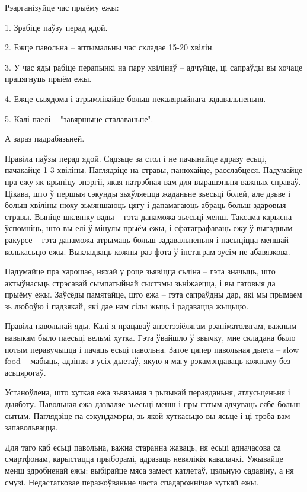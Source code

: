 Рэарганізуйце час прыёму ежы:

1. Зрабіце паўзу перад ядой.

2. Ежце павольна – аптымальны час складае 15-20 хвілін.

3. У час яды рабіце перапынкі на пару хвілінаў – адчуйце, ці сапраўды вы хочаце працягнуць прыём ежы.

4. Ежце сьвядома і атрымлівайце больш некалярыйнага задавальненьня.

5. Калі паелі – "завяршыце сталаваньне".

А зараз падрабязьней.

Правіла паўзы перад ядой. Сядзьце за стол і не пачынайце адразу есьці, пачакайце 1-3 хвіліны. Паглядзіце на стравы, панюхайце, расслабцеся. Падумайце пра ежу як крыніцу энэргіі, якая патрэбная вам для вырашэньня важных справаў. Цікава, што ў першыя сэкунды зьяўляецца жаданьне зьесьці болей, але дзьве і больш хвіліны нюху зьмяншаюць цягу і дапамагаюць абраць больш здаровыя стравы. Выпіце шклянку вады – гэта дапаможа зьесьці менш. Таксама карысна ўспомніць, што вы елі ў мінулы прыём ежы, і сфатаграфаваць ежу ў выгадным ракурсе – гэта дапаможа атрымаць больш задавальненьня і насыціцца меншай колькасьцю ежы. Выкладваць кожны раз фота ў інстаграм зусім не абавязкова.

Падумайце пра харошае, няхай у роце зьявіцца сьліна – гэта значыць, што актыўнасьць стрэсавай сымпатыйнай сыстэмы зьніжаецца, і вы гатовыя да прыёму ежы. Заўсёды памятайце, што ежа – гэта сапраўдны дар, які мы прымаем зь любоўю і падзякай, які дае нам сілы жыць і радавацца жыцьцю.

Правіла павольнай яды. Калі я працаваў анэстэзіёлягам-рэаніматолягам, важным навыкам было паесьці вельмі хутка. Гэта ўвайшло ў звычку, мне складана было потым перавучыцца і пачаць есьці павольна. Затое цяпер павольная дыета – slow food – мабыць, адзіная з усіх дыетаў, якую я магу рэкамэндаваць кожнаму без асьцярогаў.

Устаноўлена, што хуткая ежа зьвязаная з рызыкай пераяданьня, атлусьценьня і дыябэту. Павольная ежа дазваляе зьесьці менш і пры гэтым адчуваць сябе больш сытым. Паглядзіце па сэкундамэры, зь якой хуткасьцю вы ясьце і ці трэба вам запавольвацца.

Для таго каб есьці павольна, важна старанна жаваць, ня есьці адначасова са смартфонам, карыстацца прыборамі, адразаць невялікія кавалачкі. Ужывайце менш здробненай ежы: выбірайце мяса замест катлетаў, цэльную садавіну, а ня смузі. Недастатковае перажоўваньне часта спадарожнічае хуткай ежы.

